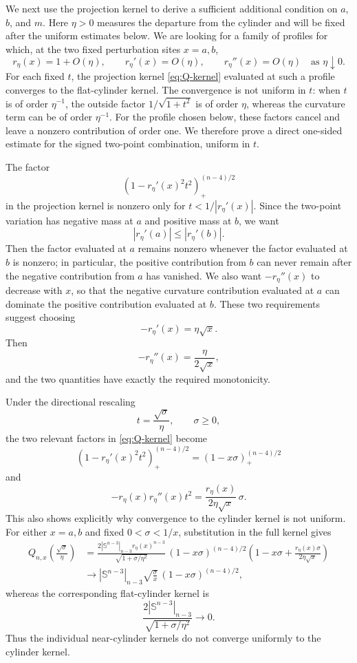 \documentclass[11pt]{article}
\theoremstyle{remark}
\newcommand{\Sph}{\mathbb{S}}
\newcommand{\pos}[1]{(#1)_{+}}
\begin{document}
We next use the projection kernel to derive a sufficient additional
condition on $a$, $b$, and $m$.  Here $\eta>0$ measures the departure from
the cylinder and will be fixed after the uniform estimates below.  We are looking for
a family of profiles for which, at the two fixed perturbation sites
$x=a,b$,
\[
 r_\eta(x)=1+O(\eta),\qquad
 r_\eta'(x)=O(\eta),\qquad
 r_\eta''(x)=O(\eta)
 \quad\text{as }\eta\downarrow0.
\]
For each fixed $t$, the projection kernel \eqref{eq:Q-kernel} evaluated at
such a profile converges to the flat-cylinder kernel.  The convergence is
not uniform in $t$: when $t$ is of order $\eta^{-1}$, the outside factor
$1/\sqrt{1+t^2}$ is of order $\eta$, whereas the curvature term can be of
order $\eta^{-1}$.  For the profile chosen below, these factors cancel and
leave a nonzero contribution of order one.  We therefore prove a direct
one-sided estimate for the signed two-point combination, uniform in $t$.

The factor
\[
 \pos{1-r_\eta'(x)^2t^2}^{(n-4)/2}
\]
in the projection kernel is nonzero only for
$t<1/|r_\eta'(x)|$.  Since the two-point variation has negative mass at
$a$ and positive mass at $b$, we want
\[
 |r_\eta'(a)|\leq |r_\eta'(b)|.
\]
Then the factor evaluated at $a$ remains nonzero whenever the factor
evaluated at $b$ is nonzero; in particular, the positive contribution
from $b$ can never remain after the negative contribution from $a$ has
vanished.  We also want $-r_\eta''(x)$ to decrease with $x$, so that the negative curvature contribution evaluated at $a$ can
dominate the positive contribution evaluated at $b$.  These two
requirements suggest choosing
\[
 -r_\eta'(x)=\eta\sqrt{x}.
\]
Then
\[
 -r_\eta''(x)=\frac{\eta}{2\sqrt{x}},
\]
and the two quantities have exactly the required monotonicity.

Under the directional rescaling
\[
 t=\frac{\sqrt{\sigma}}{\eta},\qquad \sigma\geq0,
\]
the two relevant factors in \eqref{eq:Q-kernel} become
\[
 \pos{1-r_\eta'(x)^2t^2}^{(n-4)/2}
 =\pos{1-x\sigma}^{(n-4)/2}
\]
and
\[
 -r_\eta(x)r_\eta''(x)t^2
 =\frac{r_\eta(x)}{2\eta\sqrt{x}}\,\sigma.
\]
This also shows explicitly why convergence to the cylinder kernel is not
uniform.  For either $x=a,b$ and fixed $0<\sigma<1/x$, substitution in the
full kernel gives
\begin{align*}
 Q_{n,x}\left(\frac{\sqrt{\sigma}}{\eta}\right)
 &=
 \frac{2|\Sph^{n-3}|_{n-3}r_\eta(x)^{n-3}}
      {\sqrt{1+\sigma/\eta^2}}\,
 (1-x\sigma)^{(n-4)/2}
 \left(
  1-x\sigma+\frac{r_\eta(x)\sigma}{2\eta\sqrt{x}}
 \right)\\
 &\longrightarrow
 |\Sph^{n-3}|_{n-3}
 \sqrt{\frac{\sigma}{x}}\,
 (1-x\sigma)^{(n-4)/2},
\end{align*}
whereas the corresponding flat-cylinder kernel is
\[
 \frac{2|\Sph^{n-3}|_{n-3}}
      {\sqrt{1+\sigma/\eta^2}}
 \longrightarrow0.
\]
Thus the individual near-cylinder kernels do not converge uniformly to
the cylinder kernel.
\end{document}
